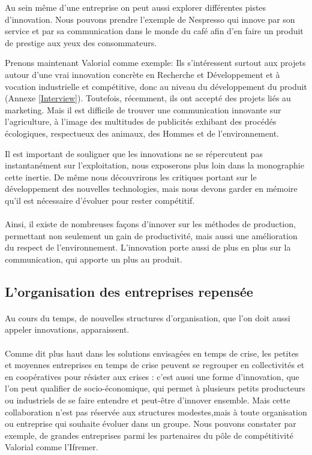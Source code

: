 \documentclass[a4paper,12pt]{report}
\begin{document}
			Au sein même d’une entreprise on peut aussi explorer différentes pistes d'innovation. Nous pouvons prendre l’exemple de Nespresso qui innove par son service et par sa communication dans le monde du café afin d’en faire un produit de prestige aux yeux des consommateurs.
			
			Prenons maintenant Valorial comme exemple: Ils s'intéressent surtout aux projets autour d'une vrai innovation concrète en Recherche et Développement et à vocation industrielle et compétitive, donc au niveau du développement du produit (Annexe \ref{Interview}). Toutefois, récemment, ils ont accepté des projets liés au marketing. Mais il est difficile de trouver une communication innovante sur l'agriculture, à l'image des multitudes de publicités exhibant des procédés écologiques, respectueux des animaux, des Hommes et de l'environnement. 
			
			Il est important de souligner que les innovations ne se répercutent pas instantanément sur l'exploitation, nous exposerons plus loin dans la monographie cette inertie. De même nous découvrirons les critiques portant sur le développement des nouvelles technologies, mais nous devons garder en mémoire qu’il est nécessaire d’évoluer pour rester compétitif.
			
		\paragraph{}Ainsi, il existe de nombreuses façons d'innover sur les méthodes de production, permettant non seulement un gain de productivité, mais aussi une amélioration du respect de l'environnement. L'innovation porte aussi de plus en plus sur la communication, qui apporte un plus au produit.
			
			
		\subsection{L'organisation des entreprises repensée}
			\paragraph{}Au cours du temps, de nouvelles structures d’organisation, que l’on doit aussi appeler innovations, apparaissent.
			
			\paragraph{}Comme dit plus haut dans les solutions envisagées en temps de crise, les petites et moyennes entreprises en temps de crise peuvent se regrouper en collectivités et en coopératives pour résister aux crises : c’est aussi une forme d’innovation, que l’on peut qualifier de socio-économique, qui permet à plusieurs petits producteurs ou industriels de se faire entendre et peut-être d’innover ensemble. 
			Mais cette collaboration n’est pas réservée aux structures modestes,mais à toute organisation ou entreprise qui souhaite évoluer dans un groupe. Nous pouvons constater par exemple, de grandes entreprises parmi les partenaires du pôle de compétitivité Valorial comme l’Ifremer.
			
\end{document}
